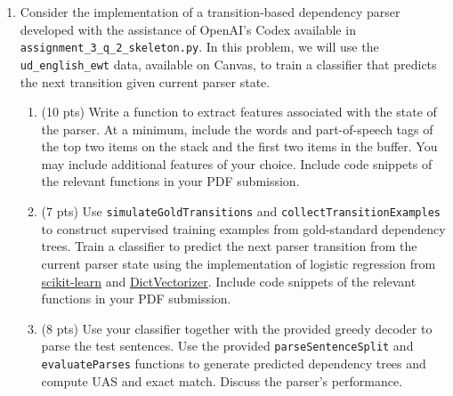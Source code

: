 \documentclass{article}
\begin{document}
\begin{enumerate}
\begin{enumerate}
        \noindent For each model, add at least two additional features that do not depend on classifications of other words (e.g. capitalization) and explain your reasoning. Discuss how you determined values for relevant hyperparameters.

        \item (7 pts) Evaluate all four models on the test set and compare performance. Show a confusion matrix for each approach and compute relevant metrics. Discuss your results and consider examples of each approach outperforming the others.
    \end{enumerate}

    \item Consider the implementation of a transition-based dependency parser developed with the assistance of OpenAI's Codex available in \verb|assignment_3_q_2_skeleton.py|. In this problem, we will use the \texttt{ud\_english\_ewt} data, available on Canvas, to train a classifier that predicts the next transition given current parser state.
    \begin{enumerate}
        \item (10 pts) Write a function to extract features associated with the state of the parser. At a minimum, include the words and part-of-speech tags of the top two items on the stack and the first two items in the buffer. You may include additional features of your choice. Include code snippets of the relevant functions in your PDF submission.

        \item (7 pts) Use \texttt{simulateGoldTransitions} and \texttt{collectTransitionExamples} to construct supervised training examples from gold-standard dependency trees. Train a classifier to predict the next parser transition from the current parser state using the implementation of logistic regression from \href{https://scikit-learn.org/stable/modules/generated/sklearn.linear_model.LogisticRegression.html}{scikit-learn} and \href{https://scikit-learn.org/stable/modules/generated/sklearn.feature_extraction.DictVectorizer.html}{DictVectorizer}. Include code snippets of the relevant functions in your PDF submission.

        \item (8 pts) Use your classifier together with the provided greedy decoder to parse the test sentences. Use the provided \texttt{parseSentenceSplit} and \texttt{evaluateParses} functions to generate predicted dependency trees and compute UAS and exact match. Discuss the parser’s performance. 
    \end{enumerate}


\end{enumerate}
\end{document}
